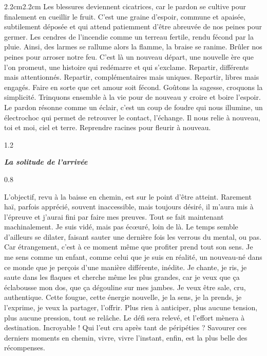 \begin{adjustwidth}{2.2cm}{2.2cm}
Les blessures deviennent cicatrices, car le pardon se cultive pour finalement en cueillir le fruit. C’est une graine d’espoir, commune et apaisée, subtilement déposée et qui attend patiemment d’être abreuvée de nos peines pour germer. Les cendres de l’incendie comme un terreau fertile, rendu fécond par la pluie. Ainsi, des larmes se rallume alors la flamme, la braise se ranime. Brûler nos peines pour arroser notre feu. C’est là un nouveau départ, une nouvelle ère que l’on promeut, une histoire qui redémarre et qui s’exclame. Repartir, différents mais attentionnés. Repartir, complémentaires mais uniques. Repartir, libres mais engagés. Faire en sorte que cet amour soit fécond. Goûtons la sagesse, croquons la simplicité. Trinquons ensemble à la vie pour de nouveau y croire et boire l’espoir. Le pardon résonne comme un éclair, c’est un coup de foudre qui nous illumine, un électrochoc qui permet de retrouver le contact, l’échange. Il nous relie à nouveau, toi et moi, ciel et terre. Reprendre racines pour fleurir à nouveau.
\begin{spacing}{1.2}
~
\end{spacing}
\begin{center}
\textbf{\textit{La solitude de l’arrivée}}
\end{center}
\begin{spacing}{0.8}
~
\end{spacing}
L’objectif, revu à la baisse en chemin, est sur le point d’être atteint. Rarement haï, parfois apprécié, souvent inaccessible, mais toujours désiré, il m’aura mis à l’épreuve et j’aurai fini par faire mes preuves. Tout se fait maintenant machinalement. Je suis vidé, mais pas écœuré, loin de là. Le temps semble d’ailleurs se dilater, faisant sauter une dernière fois les verrous du mental, ou pas. Car étrangement, c’est à ce moment même que profiter prend tout son sens. Je me sens comme un enfant, comme celui que je suis en réalité, un nouveau-né dans ce monde que je perçois d’une manière différente, inédite. Je chante, je ris, je saute dans les flaques et cherche même les plus grandes, car je veux que ça éclabousse mon dos, que ça dégouline sur mes jambes. Je veux être sale, cru, authentique. Cette fougue, cette énergie nouvelle, je la sens, je la prends, je l’exprime, je veux la partager, l’offrir. Plus rien à anticiper, plus aucune tension, plus aucune pression, tout se relâche. Le défi sera relevé, et l’effort mènera à destination. Incroyable ! Qui l’eut cru après tant de péripéties ? Savourer ces derniers moments en chemin, vivre, vivre l’instant, enfin, est la plus belle des récompenses.


\end{adjustwidth}
